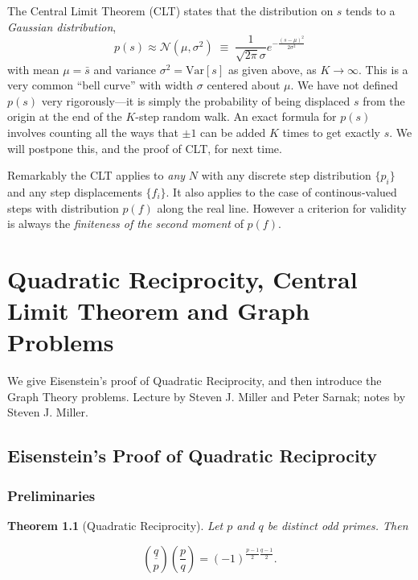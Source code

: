 \documentclass[12pt,letterpaper]{report}
\newcommand\be{\begin{equation}}
\newcommand\ee{\end{equation}}
\newcommand\lag[2]{\ensuremath{\left(\frac{#1}{#2}\right)}}
\newcommand{\js}[1]{ { \underline{#1} \choose p} }
\newtheorem{thm}{Theorem}[section]
\newcommand{\var}{\text{Var}}
\begin{document}
The Central Limit Theorem (CLT) states that the distribution on
$s$ tends to a {\em Gaussian distribution}, \be p(s) \approx
\mathcal{N}(\mu,\sigma^2) \; \equiv \; \frac{1}{\sqrt{2\pi}\sigma}
e^{-\frac{(s-\mu)^2}{2\sigma^2}} \ee with mean $\mu = \bar{s}$ and
variance $\sigma^2 = \var[s]$ as given above, as $K\rightarrow
\infty$. This is a very common ``bell curve'' with width $\sigma$
centered about $\mu$. We have not defined $p(s)$ very
rigorously---it is simply the probability of being displaced $s$
from the origin at the end of the $K$-step random walk. An exact
formula for $p(s)$ involves counting all the ways that $\pm 1$ can
be added $K$ times to get exactly $s$. We will postpone this, and
the proof of CLT, for next time.

Remarkably the CLT applies to {\em any} $N$ with any discrete step
distribution $\{p_i\}$ and any step displacements $\{f_i\}$. It
also applies to the case of continous-valued steps with
distribution $p(f)$ along the real line. However a criterion for
validity is always the {\em finiteness of the second moment} of
$p(f)$.






\chapter{Quadratic Reciprocity, Central Limit Theorem and Graph Problems}

We give Eisenstein's proof of Quadratic Reciprocity, and then
introduce the Graph Theory problems. Lecture by Steven J. Miller
and Peter Sarnak; notes by Steven J. Miller.

\section{Eisenstein's Proof of Quadratic Reciprocity}

\subsection{Preliminaries}

\begin{thm}[Quadratic Reciprocity] Let $p$ and $q$ be distinct odd
primes. Then

\be \js{q} \lag{p}{q} = (-1)^{\frac{p-1}{2}\frac{q-1}{2}}. \ee
\end{thm}
\end{document}
